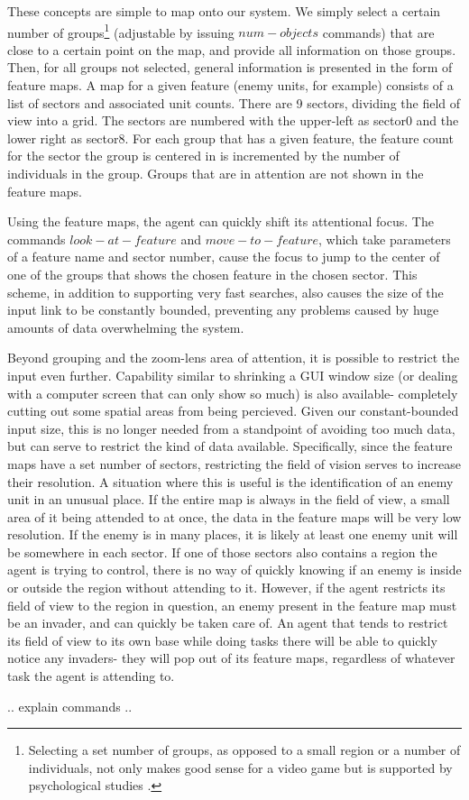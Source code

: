 These concepts are simple to map onto our system. We simply select a certain number of groups\footnote{Selecting a set number of groups, as opposed to a small region or a number of individuals, not only makes good sense for a video game but is supported by psychological studies \cite{Scholl2001}.} (adjustable by issuing $num-objects$ commands) that are close to a certain point on the map, and provide all information on those groups. Then, for all groups not selected, general information is presented in the form of feature maps. A map for a given feature (enemy units, for example) consists of a list of sectors and associated unit counts. There are 9 sectors, dividing the field of view into a grid. The sectors are numbered with the upper-left as sector0 and the lower right as sector8. For each group that has a given feature, the feature count for the sector the group is centered in is incremented by the number of individuals in the group. Groups that are in attention are not shown in the feature maps.

Using the feature maps, the agent can quickly shift its attentional focus. The commands $look-at-feature$ and $move-to-feature$, which take parameters of a feature name and sector number, cause the focus to jump to the center of one of the groups that shows the chosen feature in the chosen sector. This scheme, in addition to supporting very fast searches, also causes the size of the input link to be constantly bounded, preventing any problems caused by huge amounts of data overwhelming the system.

Beyond grouping and the zoom-lens area of attention, it is possible to restrict the input even further. Capability similar to shrinking a GUI window size (or dealing with a computer screen that can only show so much) is also available- completely cutting out some spatial areas from being percieved. Given our constant-bounded input size, this is no longer needed from a standpoint of avoiding too much data, but can serve to restrict the kind of data available. Specifically, since the feature maps have a set number of sectors, restricting the field of vision serves to increase their resolution. A situation where this is useful is the identification of an enemy unit in an unusual place. If the entire map is always in the field of view, a small area of it being attended to at once, the data in the feature maps will be very low resolution. If the enemy is in many places, it is likely at least one enemy unit will be somewhere in each sector. If one of those sectors also contains a region the agent is trying to control, there is no way of quickly knowing if an enemy is inside or outside the region without attending to it. However, if the agent restricts its field of view to the region in question, an enemy present in the feature map must be an invader, and can quickly be taken care of. An agent that tends to restrict its field of view to its own base while doing tasks there will be able to quickly notice any invaders- they will pop out of its feature maps, regardless of whatever task the agent is attending to.

.. explain commands ..
